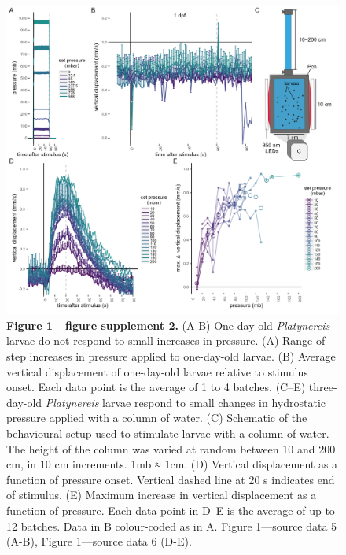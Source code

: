 \documentclass[
  11pt,
]{article}
\begin{document}
\begin{figure}[H]

{\centering \includegraphics[width=1\textwidth,height=\textheight]{Figures/Figure1-FigureSupplement2.png}

}

\caption{\textbf{Figure 1---figure supplement 2. } (A-B) One-day-old
\emph{Platynereis} larvae do not respond to small increases in pressure.
(A) Range of step increases in pressure applied to one-day-old larvae.
(B) Average vertical displacement of one-day-old larvae relative to
stimulus onset. Each data point is the average of 1 to 4 batches. (C--E)
three-day-old \emph{Platynereis} larvae respond to small changes in
hydrostatic pressure applied with a column of water. (C) Schematic of
the behavioural setup used to stimulate larvae with a column of water.
The height of the column was varied at random between 10 and 200 cm, in
10 cm increments. 1mb ≈ 1cm. (D) Vertical displacement as a function of
pressure onset. Vertical dashed line at 20 s indicates end of stimulus.
(E) Maximum increase in vertical displacement as a function of pressure.
Each data point in D--E is the average of up to 12 batches. Data in B
colour-coded as in A. Figure 1---source data 5 (A-B), Figure 1---source
data 6 (D-E).}

\end{figure}%
\end{document}
